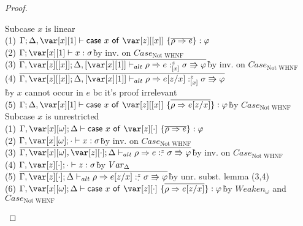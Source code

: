 \BinderSwapTheorem

%
%
%
%

\begin{proof}~
\begin{tabbing}
    Subcase $x$ is linear\\
    (1) $\G; \D,\xl \vdash \ccase{x}{\z[\irr{x}]~\{\ov{\rho \Rightarrow e}\}} : \vp$\\
    (2) $\G; \xl \vdash x : \s$\`by inv. on $Case_\textrm{Not WHNF}$\\
    (3) $\ov{\G, \z[\irr{x}]; \D, \irr{\xl} \vdash_{alt} \rho \Rightarrow e :^z_{\irr{x}} \s \Rrightarrow \vp}$\`by inv. on $Case_\textrm{Not WHNF}$\\
    (4) $\ov{\G, \z[\irr{x}]; \D, \irr{\xl} \vdash_{alt} \rho \Rightarrow e[z/x] :^z_{\irr{x}} \s \Rrightarrow \vp}$\\\`by $x$ cannot occur in $e$ bc it's proof irrelevant\\
    (5) $\G;\D,\xl \vdash \ccase{x}{\z[\irr{x}]~\{\ov{\rho \Rightarrow e[z/x]}\}} : \vp$\`by $Case_\textrm{Not WHNF}$\\
    Subcase $x$ is unrestricted\\
    (1) $\G,\xo; \D \vdash \ccase{x}{\z[\cdot]~\{\ov{\rho \Rightarrow e}\}} : \vp$\\
    (2) $\G,\xo; \cdot \vdash x : \s$\`by inv. on $Case_\textrm{Not WHNF}$\\
    (3) $\ov{\G,\xo, \z[\cdot]; \D \vdash_{alt} \rho \Rightarrow e :^z_{\cdot} \s \Rrightarrow \vp}$\`by inv. on $Case_\textrm{Not WHNF}$\\
    (4) $\G,\z[\cdot]; \cdot \vdash z : \s$\`by $Var_\Delta$\\
    (5) $\ov{\G, \z[\cdot]; \D \vdash_{alt} \rho \Rightarrow e[z/x] :^z_{\cdot} \s \Rrightarrow \vp}$\`by unr. subst. lemma (3,4)\\
    (6) $\G,\xo;\D \vdash \ccase{x}{\z[\cdot]~\{\ov{\rho \Rightarrow e[z/x]}\}} : \vp$\`by $Weaken_\omega$ and $Case_\textrm{Not WHNF}$\\
\end{tabbing}



\end{proof}
